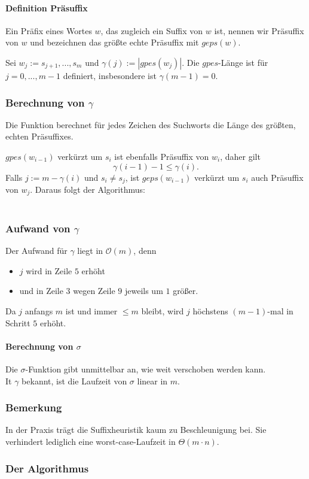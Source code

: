 \paragraph{Definition Präsuffix}
Ein Präfix eines Wortes \(w\), das zugleich ein Suffix von \(w\) ist, nennen wir Präsuffix von \(w\) und bezeichnen das größte echte Präsuffix mit \(geps(w)\).

Sei \(w_j := s_{j+1},...,s_m\) und \(\gamma(j) := |gpes(w_j)|\). Die \(gpes\)-Länge ist für \(j=0,...,m-1\) definiert, insbesondere ist \(\gamma(m-1)=0\).

\subsubsection{Berechnung von \(\gamma\)}
Die Funktion berechnet für jedes Zeichen des Suchworts die Länge des größten, echten Präsuffixes.

\(gpes(w_{i-1})\) verkürzt um \(s_i\) ist ebenfalls Präsuffix von \(w_i\), daher gilt
\[\gamma(i-1) -1 \leq \gamma(i).\]
Falls \(j := m-\gamma(i)\) und \(s_i \ne s_j\), ist \(geps(w_{i-1})\) verkürzt um \(s_i\) auch Präsuffix von \(w_j\). Daraus folgt der Algorithmus:
\\\\


\subsubsection{Aufwand von \(\gamma\)}
Der Aufwand für \(\gamma\) liegt in \(\mathcal{O}(m)\), denn
\begin{itemize}
	\item \(j\) wird in Zeile \(5\) erhöht
	\item und in Zeile \(3\) wegen Zeile \(9\) jeweils um \(1\) größer.
\end{itemize}
Da \(j\) anfangs \(m\) ist und immer \(\leq m\) bleibt, wird \(j\) höchstens \((m-1)\)-mal in Schritt \(5\) erhöht.

\paragraph{Berechnung von \(\sigma\)}
Die \(\sigma\)-Funktion gibt unmittelbar an, wie weit verschoben werden kann.
\text{}\\

It \(\gamma\) bekannt, ist die Laufzeit von \(\sigma\) linear in \(m\).

\subsubsection{Bemerkung}
In der Praxis trägt die Suffixheuristik kaum zu Beschleunigung bei. Sie verhindert lediglich eine worst-case-Laufzeit in \(\Theta(m\cdot n)\).

\subsubsection{Der Algorithmus}

